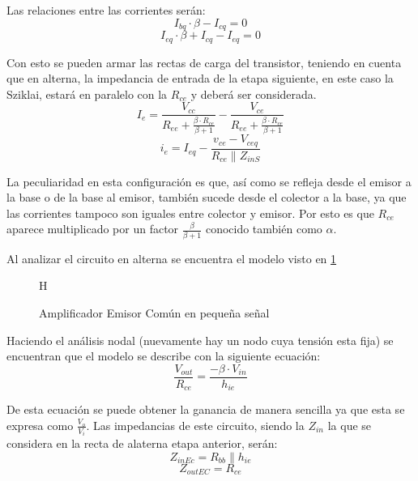 Las relaciones entre las corrientes serán:
\begin{equation}
    I_{bq}\cdot \beta - I_{cq} = 0
    \label{AmpEC}
\end{equation}
\begin{equation}
    I_{eq} \cdot \beta + I_{cq} - I_{eq} = 0 
    \label{SumEC}
\end{equation}

Con esto se pueden armar las rectas de carga del transistor, teniendo en cuenta que en alterna, la impedancia de entrada de la etapa siguiente, en este caso la Sziklai, estará en paralelo con la $R_{ce}$ y deberá ser considerada.
\begin{equation}
    I_{e} = \frac{V_{cc}}{R_{ee} + \frac{\beta \cdot R_{ce}}{\beta + 1}} - \frac{V_{ce}}{R_{ee} + \frac{\beta \cdot R_{ce}}{\beta + 1}}
    \label{Carga_EC}
\end{equation}
\begin{equation}
    i_e = I_{eq} - \frac{v_{ce}-V_{ceq}}{R_{ce} \parallel Z_{inS}}
    \label{Carga_aEc}
\end{equation}

La peculiaridad en esta configuración es que, así como se refleja desde el emisor a la base o de la base al emisor, también sucede desde el colector a la base, ya que las corrientes tampoco son iguales entre colector y emisor. Por esto es que $R_{ce}$ aparece multiplicado por un factor $\frac{\beta}{\beta+1}$ conocido también como $\alpha$.

Al analizar el circuito en alterna se encuentra el modelo visto en \cref{fig:EMPS}

\begin{figure}{H}
    \centering
    
    \caption{Amplificador Emisor Común en pequeña señal}
    \label{fig:EMPS}
\end{figure}

Haciendo el análisis nodal (nuevamente hay un nodo cuya tensión esta fija) se encuentran que el modelo se describe con la siguiente ecuación:
\begin{equation}
    \frac{V_{out}}{R_{ce}} = \frac{-\beta \cdot V_{in}}{h_{ie}}  
    \label{AmpECPS}
\end{equation}

De esta ecuación se puede obtener la ganancia de manera sencilla ya que esta se expresa como $\frac{V_o}{V_i}$. Las impedancias de este circuito, siendo la $Z_{in}$ la que se considera en la recta de alaterna etapa anterior, serán:
\begin{equation}
    Z_{inEc} = R_{bb} \parallel h_{ie}
    \label{ZinEC}
\end{equation}
\begin{equation}
    Z_{outEC} = R_{ce}
    \label{ZoEC}
\end{equation}

